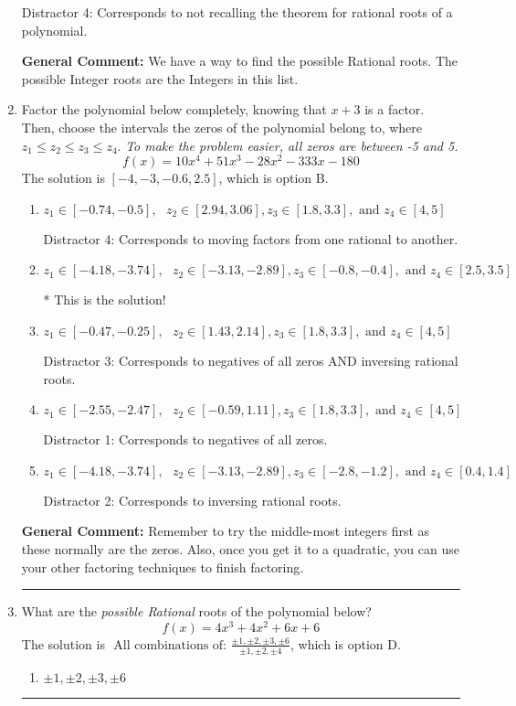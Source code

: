 \documentclass{extbook}[14pt]
\newcommand{\litem}[1]{\item #1

\rule{\textwidth}{0.4pt}}
\begin{document}
\begin{enumerate}
{\begin{enumerate}[label=\Alph*.]
 Distractor 4: Corresponds to not recalling the theorem for rational roots of a polynomial.
\end{enumerate}

\textbf{General Comment:} We have a way to find the possible Rational roots. The possible Integer roots are the Integers in this list.
}
\litem{
Factor the polynomial below completely, knowing that $x + 3$ is a factor. Then, choose the intervals the zeros of the polynomial belong to, where $z_1 \leq z_2 \leq z_3 \leq z_4$. \textit{To make the problem easier, all zeros are between -5 and 5.}
\[ f(x) = 10x^{4} +51 x^{3} -28 x^{2} -333 x -180 \]The solution is \( [-4, -3, -0.6, 2.5] \), which is option B.\begin{enumerate}[label=\Alph*.]
\item \( z_1 \in [-0.74, -0.5], \text{   }  z_2 \in [2.94, 3.06], z_3 \in [1.8, 3.3], \text{   and   } z_4 \in [4, 5] \)

 Distractor 4: Corresponds to moving factors from one rational to another.
\item \( z_1 \in [-4.18, -3.74], \text{   }  z_2 \in [-3.13, -2.89], z_3 \in [-0.8, -0.4], \text{   and   } z_4 \in [2.5, 3.5] \)

* This is the solution!
\item \( z_1 \in [-0.47, -0.25], \text{   }  z_2 \in [1.43, 2.14], z_3 \in [1.8, 3.3], \text{   and   } z_4 \in [4, 5] \)

 Distractor 3: Corresponds to negatives of all zeros AND inversing rational roots.
\item \( z_1 \in [-2.55, -2.47], \text{   }  z_2 \in [-0.59, 1.11], z_3 \in [1.8, 3.3], \text{   and   } z_4 \in [4, 5] \)

 Distractor 1: Corresponds to negatives of all zeros.
\item \( z_1 \in [-4.18, -3.74], \text{   }  z_2 \in [-3.13, -2.89], z_3 \in [-2.8, -1.2], \text{   and   } z_4 \in [0.4, 1.4] \)

 Distractor 2: Corresponds to inversing rational roots.
\end{enumerate}

\textbf{General Comment:} Remember to try the middle-most integers first as these normally are the zeros. Also, once you get it to a quadratic, you can use your other factoring techniques to finish factoring.
}
\litem{
What are the \textit{possible Rational} roots of the polynomial below?
\[ f(x) = 4x^{3} +4 x^{2} +6 x + 6 \]The solution is \( \text{ All combinations of: }\frac{\pm 1,\pm 2,\pm 3,\pm 6}{\pm 1,\pm 2,\pm 4} \), which is option D.\begin{enumerate}[label=\Alph*.]
\item \( \pm 1,\pm 2,\pm 3,\pm 6 \)


\end{enumerate}}
\end{enumerate}
\end{document}
